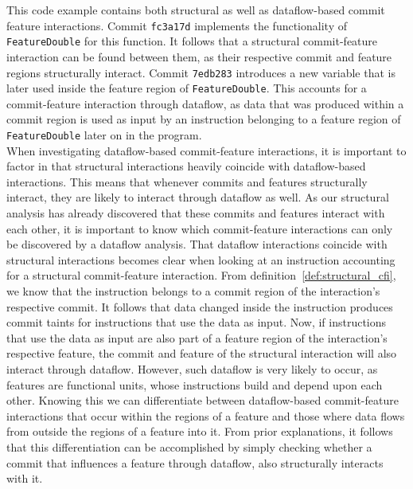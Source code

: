 \textsf{This code example contains both structural as well as dataflow-based commit feature interactions.
Commit \texttt{fc3a17d} implements the functionality of \texttt{FeatureDouble} for this function.
It follows that a structural commit-feature interaction can be found between them, as their respective commit and feature regions structurally interact.
Commit \texttt{7edb283} introduces a new variable that is later used inside the feature region of \texttt{FeatureDouble}. 
This accounts for a commit-feature interaction through dataflow, as data that was produced within a commit region is used as input 
by an instruction belonging to a feature region of \texttt{FeatureDouble} later on in the program.} \\

When investigating dataflow-based commit-feature interactions, it is important to factor in that structural interactions heavily coincide with dataflow-based interactions.
This means that whenever commits and features structurally interact, they are likely to interact through dataflow as well.
As our structural analysis has already discovered that these commits and features interact with each other, it is important to know which commit-feature interactions can only be discovered by a dataflow analysis.
That dataflow interactions coincide with structural interactions becomes clear when looking at an instruction accounting for a structural commit-feature interaction.
From definition~\ref{def:structural_cfi}, we know that the instruction belongs to a commit region of the interaction's respective commit.
It follows that data changed inside the instruction produces commit taints for instructions that use the data as input. 
Now, if instructions that use the data as input are also part of a feature region of the interaction's respective feature, the commit and feature of the structural interaction will also interact through dataflow.
However, such dataflow is very likely to occur, as features are functional units, whose instructions build and depend upon each other. 
Knowing this we can differentiate between dataflow-based commit-feature interactions that occur within the regions of a feature and those where data flows from outside the regions of a feature into it.
From prior explanations, it follows that this differentiation can be accomplished by simply checking whether a commit that influences a feature through dataflow, also structurally interacts with it. \\

